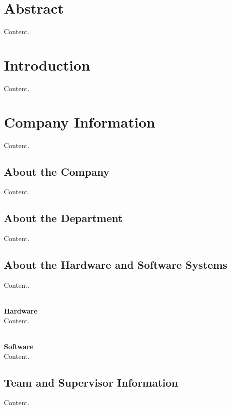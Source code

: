 \documentclass[10pt]{article}
\begin{document}
\section{Abstract}

Content.

\newpage

\section{Introduction}

Content.

\section{Company Information}

Content.

\subsection{About the Company}

Content.

\subsection{About the Department}

Content.

\subsection{About the Hardware and Software Systems}

Content.

\\ \textbf{Hardware} \\

Content.

\\ \textbf{Software} \\

Content.

\subsection{Team and Supervisor Information}

Content.

\end{document}
